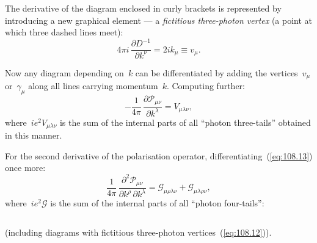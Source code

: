 
\noindent The derivative of the diagram enclosed in curly brackets is represented by introducing a new graphical element --- a \emph{fictitious three-photon vertex} (a point at which three dashed lines meet):
\begin{equation}
4\pi i\,\frac{\partial D^{-1}}{\partial k^\nu} = 2ik_\mu \equiv v_\mu.
\label{eq:108.12}
\end{equation}

Now any diagram depending on~$k$ can be differentiated by adding the vertices~$v_\mu$ or~$\gamma_\mu$ along all lines carrying momentum~$k$. Computing further:
\begin{equation}
-\frac{1}{4\pi}\,\frac{\partial\mathcal{P}_{\mu\nu}}{\partial k^\lambda} = V_{\mu\lambda\nu},
\label{eq:108.13}
\end{equation}
where~$ie^2 V_{\mu\lambda\nu}$ is the sum of the internal parts of all ``photon three-tails'' obtained in this manner.

For the second derivative of the polarisation operator, differentiating~(\ref{eq:108.13}) once more:
\begin{equation}
\frac{1}{4\pi}\,\frac{\partial^2\mathcal{P}_{\mu\nu}}{\partial k^\rho\,\partial k^\lambda} = \mathcal{G}_{\mu\rho\lambda\nu} + \mathcal{G}_{\mu\lambda\rho\nu},
\label{eq:108.14}
\end{equation}
where~$ie^2\mathcal{G}$ is the sum of the internal parts of all ``photon four-tails'':

\begin{equation}
\label{eq:108.15}
\end{equation}

\noindent (including diagrams with fictitious three-photon vertices~(\ref{eq:108.12})).
